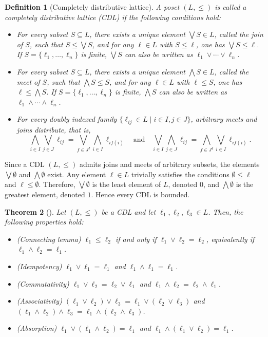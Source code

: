 \documentclass[a4paper,10pt]{article}
\newtheorem{theorem}{Theorem}[section]
\newtheorem{definition}[theorem]{Definition}
\begin{document}
\begin{definition}[Completely distributive lattice]
A poset \((L,\leq)\) is called a \emph{completely distributive lattice} (CDL) if the following conditions hold:
\begin{itemize}
\item For every subset \(S \subseteq L\), there exists a unique element \(\bigvee S \in L\), called the \emph{join of \(S\)}, such that \(S \leq \bigvee S\), and for any \(\ell \in L\) with \(S \leq \ell\), one has \(\bigvee S \leq \ell\). If \(S = \{\ell_1,\dots,\ell_n\}\) is finite, \(\bigvee\! S\) can also be written as \(\ell_1 \vee \cdots \vee \ell_n\).
\item For every subset \(S \subseteq L\), there exists a unique element \(\bigwedge S \in L\), called the \emph{meet of \(S\)}, such that \(\bigwedge S \leq S\), and for any \(\ell \in L\) with \(\ell \leq S\), one has \(\ell \leq \bigwedge S\). If \(S = \{\ell_1,\dots,\ell_n\}\) is finite, \(\bigwedge\! S\) can also be written as \(\ell_1 \wedge \cdots \wedge \ell_n\).
\item For every doubly indexed family \(\{\ell_{ij} \in L \mid i \in I, j \in J\}\), arbitrary meets and joins distribute, that is,
\[
\bigwedge_{i \in I} \bigvee_{j \in J} \ell_{ij}
=
\bigvee_{f \in J^I} \bigwedge_{i \in I} \ell_{i f(i)}
\quad \text{and} \quad
\bigvee_{i \in I} \bigwedge_{j \in J} \ell_{ij}
=
\bigwedge_{f \in J^I} \bigvee_{i \in I} \ell_{i f(i)}.
\]
\end{itemize}
\end{definition}

Since a CDL \((L,\leq)\) admits joins and meets of arbitrary subsets, the elements \(\bigvee \emptyset\) and \(\bigwedge \emptyset\) exist. Any element \(\ell \in L\) trivially satisfies the conditions \(\emptyset \leq \ell\) and \(\ell \leq \emptyset\). Therefore, \(\bigvee \emptyset\) is the least element of \(L\), denoted \(0\), and \(\bigwedge \emptyset\) is the greatest element, denoted \(1\). Hence every CDL is bounded.

\begin{theorem}[\cite{davey2002introduction}]
\label{thm:lattices_laws}
Let \((L,\leq)\) be a CDL and let \(\ell_1,\ell_2,\ell_3 \in L\). Then, the following properties hold:
\begin{itemize}
\item (Connecting lemma) \(\ell_1 \leq \ell_2\) if and only if \(\ell_1 \vee \ell_2 = \ell_2\), equivalently if \(\ell_1 \wedge \ell_2 = \ell_1\).
\item (Idempotency) \(\ell_1 \vee \ell_1 = \ell_1\) and \(\ell_1 \wedge \ell_1 = \ell_1\).
\item (Commutativity) \(\ell_1 \vee \ell_2 = \ell_2 \vee \ell_1\) and \(\ell_1 \wedge \ell_2 = \ell_2 \wedge \ell_1\).
\item (Associativity) \((\ell_1 \vee \ell_2) \vee \ell_3 = \ell_1 \vee (\ell_2 \vee \ell_3)\) and \((\ell_1 \wedge \ell_2) \wedge \ell_3 = \ell_1 \wedge (\ell_2 \wedge \ell_3)\).
\item (Absorption) \(\ell_1 \vee (\ell_1 \wedge \ell_2) = \ell_1\) and \(\ell_1 \wedge (\ell_1 \vee \ell_2) = \ell_1\).
\end{itemize}
\end{theorem}
\end{document}
